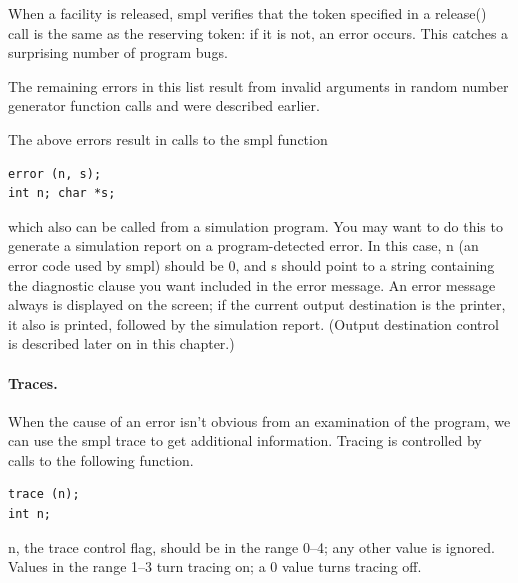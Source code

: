 When a facility is released, smpl verifies that the token specified in a
release() call is the same as the reserving token: if it is not, an error
occurs. This catches a surprising number of program bugs.

The remaining errors in this list result from invalid arguments in random
number generator function calls and were described earlier.

The above errors result in calls to the smpl function

\begin{verbatim}
error (n, s);
int n; char *s;
\end{verbatim}

which also can be called from a simulation program. You may want to do this to
generate a simulation report on a program-detected error. In this case, n (an
error code used by smpl) should be 0, and s should point to a string
containing the diagnostic clause you want included in the error message. An
error message always is displayed on the screen; if the current output
destination is the printer, it also is printed, followed by the simulation
report. (Output destination control is described later on in this chapter.)

\paragraph{Traces.}
When the cause of an error isn't obvious from an examination of the program,
we can use the smpl trace to get additional information. Tracing is controlled
by calls to the following function.

\begin{verbatim}
trace (n);
int n;
\end{verbatim}

n, the trace control flag, should be in the range 0--4; any other value is
ignored. Values in the range 1--3 turn tracing on; a 0 value turns tracing off.

